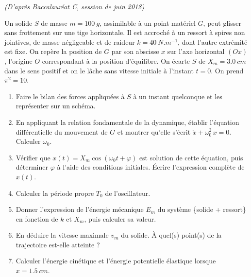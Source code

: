 \documentclass[11pt]{article}
\begin{document}
\begin{exercice}
\textit{(D'après Baccalauréat C, session de juin 2018)}

Un solide $S$ de masse $m = \SI{100}{g}$, assimilable à un point matériel $G$, peut glisser sans frottement sur une tige horizontale. Il est accroché à un ressort à spires non jointives, de masse négligeable et de raideur $k = \SI{40}{N.m^{-1}}$, dont l'autre extrémité est fixe. On repère la position de $G$ par son abscisse $x$ sur l'axe horizontal $(Ox)$, l'origine $O$ correspondant à la position d'équilibre. On écarte $S$ de $X_m = \SI{3,0}{cm}$ dans le sens positif et on le lâche sans vitesse initiale à l'instant $t = 0$. On prend $\pi^2 = 10$.
\begin{enumerate}
\item Faire le bilan des forces appliquées à $S$ à un instant quelconque et les représenter sur un schéma.
\item En appliquant la relation fondamentale de la dynamique, établir l'équation différentielle du mouvement de $G$ et montrer qu'elle s'écrit $\ddot{x} + \omega_0^2\,x = 0$. Calculer $\omega_0$.
\item Vérifier que $x(t) = X_m\cos(\omega_0 t + \varphi)$ est solution de cette équation, puis déterminer $\varphi$ à l'aide des conditions initiales. Écrire l'expression complète de $x(t)$.
\item Calculer la période propre $T_0$ de l'oscillateur.
\item Donner l'expression de l'énergie mécanique $E_m$ du système \{solide + ressort\} en fonction de $k$ et $X_m$, puis calculer sa valeur.
\item En déduire la vitesse maximale $v_m$ du solide. À quel(s) point(s) de la trajectoire est-elle atteinte ?
\item Calculer l'énergie cinétique et l'énergie potentielle élastique lorsque $x = \SI{1,5}{cm}$.
\end{enumerate}
\end{exercice}
\end{document}
